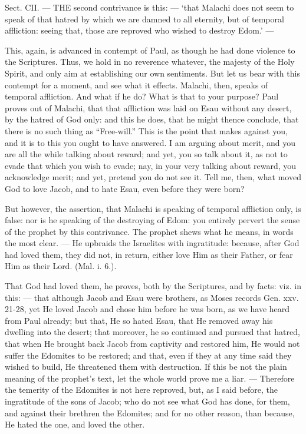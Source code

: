 
Sect. CII. — THE second contrivance is this: — ‘that Malachi does not seem to speak of that hatred by which we are damned to all eternity, but of temporal affliction: seeing that, those are reproved who wished to destroy Edom.’ —

This, again, is advanced in contempt of Paul, as though he had done violence to the Scriptures. Thus, we hold in no reverence whatever, the majesty of the Holy Spirit, and only aim at establishing our own sentiments. But let us bear with this contempt for a moment, and see what it effects. Malachi, then, speaks of temporal affliction. And what if he do? What is that to your purpose? Paul proves out of Malachi, that that affliction was laid on Esau without any desert, by the hatred of God only: and this he does, that he might thence conclude, that there is no such thing as “Free-will.” This is the point that makes against you, and it is to this you ought to have answered. I am arguing about merit, and you are all the while talking about reward; and yet, you so talk about it, as not to evade that which you wish to evade; nay, in your very talking about reward, you acknowledge merit; and yet, pretend you do not see it. Tell me, then, what moved God to love Jacob, and to hate Esau, even before they were born?

But however, the assertion, that Malachi is speaking of temporal affliction only, is false: nor is he speaking of the destroying of Edom: you entirely pervert the sense of the prophet by this contrivance. The prophet shews what he means, in words the most clear. — He upbraids the Israelites with ingratitude: because, after God had loved them, they did not, in return, either love Him as their Father, or fear Him as their Lord. (Mal. i. 6.).

That God had loved them, he proves, both by the Scriptures, and by facts: viz. in this: — that although Jacob and Esau were brothers, as Moses records Gen. xxv. 21-28, yet He loved Jacob and chose him before he was born, as we have heard from Paul already; but that, He so hated Esau, that He removed away his dwelling into the desert; that moreover, he so continued and pursued that hatred, that when He brought back Jacob from captivity and restored him, He would not suffer the Edomites to be restored; and that, even if they at any time said they wished to build, He threatened them with destruction. If this be not the plain meaning of the prophet’s text, let the whole world prove me a liar. — Therefore the temerity of the Edomites is not here reproved, but, as I said before, the ingratitude of the sons of Jacob; who do not see what God has done, for them, and against their brethren the Edomites; and for no other reason, than because, He hated the one, and loved the other.

